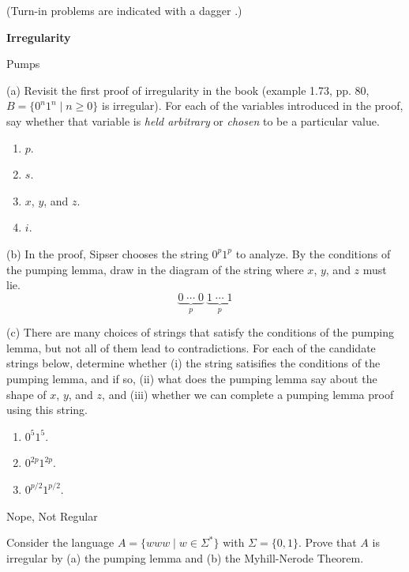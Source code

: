 \documentclass[11pt]{book}
\newcommand{\doctitle}{Irregularity}
\begin{document}
\begin{center}
  (Turn-in problems are indicated with a dagger \turninproblem{}.)
\end{center}

\begin{center}
  \large\textbf{{\doctitle}}
\end{center}

\vspace{2em}


\begin{problem}{Pumps}

\noindent (a) Revisit the first proof of irregularity in the book (example 1.73, pp. 80, \( B = \{ 0^n 1^n \mid n ≥ 0 \} \) is irregular).
For each of the variables introduced in the proof, say whether that variable is \emph{held arbitrary} or \emph{chosen} to be a particular value.
\begin{enumerate}
  \item \( p \).
  \item \( s \).
  \item \( x \), \( y \), and \( z \).
  \item \( i \).
\end{enumerate}

\noindent (b) In the proof, Sipser chooses the string \( 0^p 1 ^p \) to analyze.
By the conditions of the pumping lemma, draw in the diagram of the string where \( x \), \( y \), and \( z \) must lie.
\vspace{0.5in}
\[
  \underbrace{0\;\cdots\;0}_{p}\;\underbrace{1\;\cdots\;1}_{p}
\]
\vspace{0.5in}

\noindent (c) There are many choices of strings that satisfy the conditions of the pumping lemma, but not all of them lead to contradictions.
For each of the candidate strings below, determine whether (i) the string satisifies the conditions of the pumping lemma, and if so, (ii) what does the pumping lemma say about the shape of \( x \), \( y \), and \( z \), and (iii) whether we can complete a pumping lemma proof using this string.
\begin{enumerate}
  \item \( 0^5 1^5 \).
  \item \( 0^{2p} 1^{2p} \).
  \item \( 0^{p/2} 1^{p/2} \).
\end{enumerate}

\end{problem}


\newpage

\begin{problem}{Nope, Not Regular \turninproblem}

Consider the language \( A = \{ www \mid w \in \Sigma^* \} \) with \( \Sigma = \{ 0, 1 \} \).
Prove that \( A \) is irregular by (a) the pumping lemma and (b) the Myhill-Nerode Theorem.

\end{problem}
\end{document}
